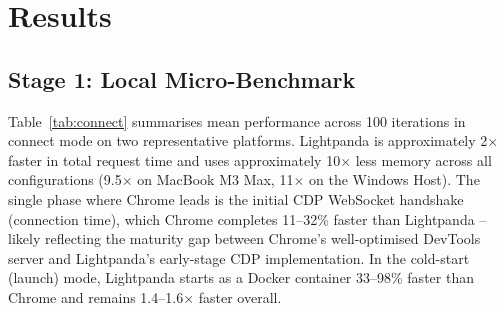 \section{Results}
\label{sec:results}

\subsection{Stage 1: Local Micro-Benchmark}

Table~\ref{tab:connect} summarises mean performance across 100 iterations in connect mode on two representative platforms. Lightpanda is approximately 2$\times$ faster in total request time and uses approximately 10$\times$ less memory across all configurations (9.5$\times$ on MacBook M3 Max, 11$\times$ on the Windows Host). The single phase where Chrome leads is the initial CDP WebSocket handshake (connection time), which Chrome completes 11--32\% faster than Lightpanda -- likely reflecting the maturity gap between Chrome's well-optimised DevTools server and Lightpanda's early-stage CDP implementation. In the cold-start (launch) mode, Lightpanda starts as a Docker container 33--98\% faster than Chrome and remains 1.4--1.6$\times$ faster overall.

\begin{table}[t]
\centering
\caption{Stage 1 -- local connect-mode benchmark (100 iterations, mean values)}
\label{tab:connect}
\end{table}

